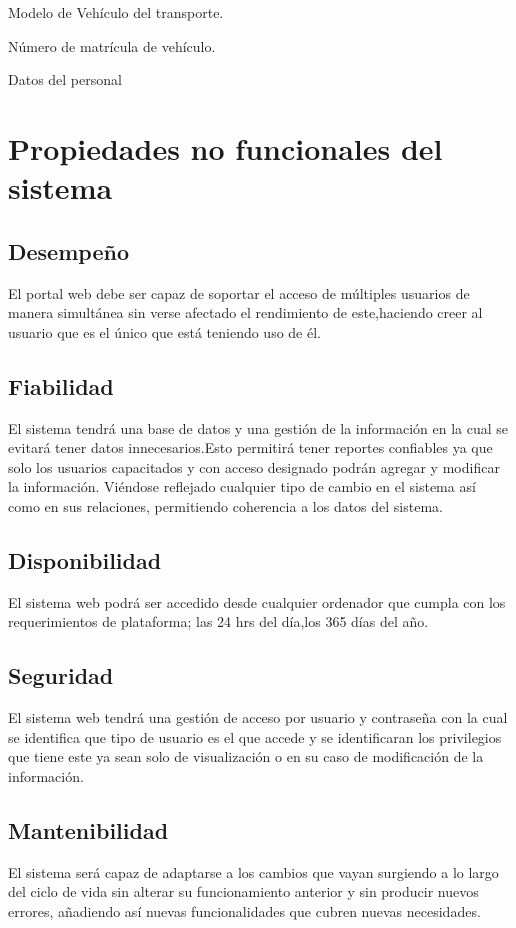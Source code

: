 \textbullet Modelo de Vehículo   del transporte.

\textbullet Número de matrícula de vehículo.

\textbullet Datos del personal

\section{Propiedades no funcionales del sistema}


\subsection{Desempeño}
El portal web debe ser capaz de soportar el acceso de múltiples usuarios de manera simultánea sin verse afectado el rendimiento de este,haciendo creer al usuario que es el único que está teniendo uso de  él.
 
\subsection{Fiabilidad}
El sistema tendrá una base de datos y una gestión de la información en la cual se evitará tener datos innecesarios.Esto permitirá tener reportes confiables ya que solo los usuarios capacitados  y con acceso designado podrán agregar y modificar la información. Viéndose reflejado cualquier tipo de cambio en el sistema así como en sus relaciones, permitiendo coherencia a los datos del sistema.
\subsection{Disponibilidad}
El sistema web podrá ser accedido desde cualquier ordenador que cumpla con los requerimientos de plataforma; las 24 hrs del día,los 365 días del año.

\subsection{Seguridad}
El sistema web tendrá una gestión de acceso por usuario y contraseña con la cual se identifica que tipo de usuario es el que accede y se identificaran los privilegios que tiene este ya sean solo de visualización o en su caso de modificación de la información.

\subsection{Mantenibilidad}
El sistema será capaz de adaptarse a los cambios que vayan surgiendo a lo largo del ciclo de vida sin alterar su funcionamiento anterior y sin producir nuevos errores, añadiendo así nuevas funcionalidades que cubren nuevas necesidades.

